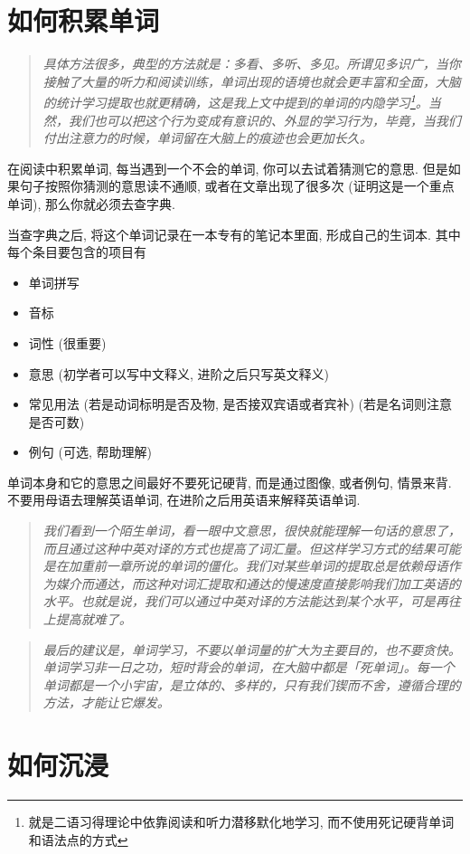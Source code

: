 \documentclass[a4paper]{article}
\begin{document}
\section{如何积累单词}
\begin{quote}
  \textit{具体方法很多，典型的方法就是：多看、多听、多见。所谓见多识广，当你接触了大量的听力和阅读训练，单词出现的语境也就会更丰富和全面，大脑的统计学习提取也就更精确，这是我上文中提到的单词的内隐学习\footnote{就是二语习得理论中依靠阅读和听力潜移默化地学习, 而不使用死记硬背单词和语法点的方式}。当然，我们也可以把这个行为变成有意识的、外显的学习行为，毕竟，当我们付出注意力的时候，单词留在大脑上的痕迹也会更加长久。}
\end{quote}
在阅读中积累单词, 每当遇到一个不会的单词, 你可以去试着猜测它的意思. 但是如果句子按照你猜测的意思读不通顺, 或者在文章出现了很多次 (证明这是一个重点单词), 那么你就必须去查字典. 
\par
当查字典之后, 将这个单词记录在一本专有的笔记本里面, 形成自己的生词本. 其中每个条目要包含的项目有
\begin{itemize}
  \item 单词拼写
  \item 音标
  \item 词性 (很重要)
  \item 意思 (初学者可以写中文释义, 进阶之后只写英文释义)
  \item 常见用法 (若是动词标明是否及物, 是否接双宾语或者宾补) (若是名词则注意是否可数)
  \item 例句 (可选, 帮助理解)
\end{itemize}
单词本身和它的意思之间最好不要死记硬背, 而是通过图像, 或者例句, 情景来背. 不要用母语去理解英语单词, 在进阶之后用英语来解释英语单词. 
\begin{quote}
  \textit{我们看到一个陌生单词，看一眼中文意思，很快就能理解一句话的意思了，而且通过这种中英对译的方式也提高了词汇量。但这样学习方式的结果可能是在加重前一章所说的单词的僵化。我们对某些单词的提取总是依赖母语作为媒介而通达，而这种对词汇提取和通达的慢速度直接影响我们加工英语的水平。也就是说，我们可以通过中英对译的方法能达到某个水平，可是再往上提高就难了。}
\end{quote}
\begin{quote}
  \textit{最后的建议是，单词学习，不要以单词量的扩大为主要目的，也不要贪快。单词学习非一日之功，短时背会的单词，在大脑中都是「死单词」。每一个单词都是一个小宇宙，是立体的、多样的，只有我们锲而不舍，遵循合理的方法，才能让它爆发。}
\end{quote}
\section{如何沉浸}
\end{document}
